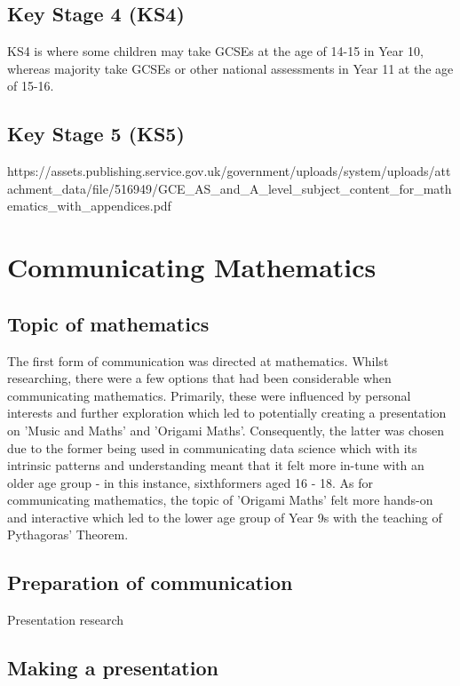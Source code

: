 \documentclass[12pt, a4paper,oneside]{book}
\numberwithin{equation}{section}
\begin{document}
\section{Key Stage 4 (KS4)}\label{sec:x.x}

KS4 is where some children may take GCSEs at the age of 14-15 in Year 10, whereas majority take GCSEs or other national assessments in Year 11 at the age of 15-16.

\section{Key Stage 5 (KS5)}\label{sec:x.x}



https://assets.publishing.service.gov.uk/government/uploads/system/uploads/attachment_data/file/516949/GCE_AS_and_A_level_subject_content_for_mathematics_with_appendices.pdf


\chapter{Communicating Mathematics}\label{ch:x.x}

\section{Topic of mathematics}\label{sec:x.x}
The first form of communication was directed at mathematics. Whilst researching, there were a few options that had been considerable when communicating mathematics. Primarily, these were influenced by personal interests and further exploration which led to potentially creating a presentation on 'Music and Maths' and 'Origami Maths'. Consequently, the latter was chosen due to the former being used in communicating data science which with its intrinsic patterns and understanding meant that it felt more in-tune with an older age group - in this instance, sixthformers aged 16 - 18. As for communicating mathematics, the topic of 'Origami Maths' felt more hands-on and interactive which led to the lower age group of Year 9s with the teaching of Pythagoras' Theorem.

\section{Preparation of communication}\label{sec:x.x}

Presentation research

\section{Making a presentation}\label{sec:x.x}
\end{document}
